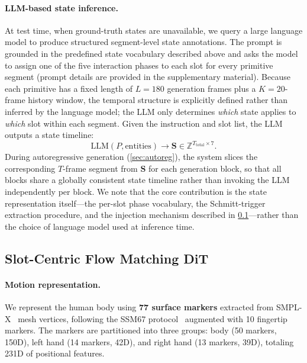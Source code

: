 \documentclass[sigconf, screen, review, anonymous]{acmart}
\begin{document}
\paragraph{LLM-based state inference.}
At test time, when ground-truth states are unavailable, we query a large language model to produce structured segment-level state annotations. The prompt is grounded in the predefined state vocabulary described above and asks the model to assign one of the five interaction phases to each slot for every primitive segment (prompt details are provided in the supplementary material). Because each primitive has a fixed length of $L{=}180$ generation frames plus a $K{=}20$-frame history window, the temporal structure is explicitly defined rather than inferred by the language model; the LLM only determines \emph{which} state applies to \emph{which} slot within each segment. Given the instruction and slot list, the LLM outputs a state timeline:
\begin{equation}
    \text{LLM}(P, \text{entities}) \rightarrow \mathbf{S} \in \mathbb{Z}^{T_{\text{total}} \times 7}.
    \label{eq:llm_planner}
\end{equation}
During autoregressive generation (\cref{sec:autoreg}), the system slices the corresponding $T$-frame segment from $\mathbf{S}$ for each generation block, so that all blocks share a globally consistent state timeline rather than invoking the LLM independently per block.
We note that the core contribution is the state representation itself---the per-slot phase vocabulary, the Schmitt-trigger extraction procedure, and the injection mechanism described in \cref{sec:slot_dit}---rather than the choice of language model used at inference time.



\subsection{Slot-Centric Flow Matching DiT}
\label{sec:slot_dit}

\paragraph{Motion representation.}
We represent the human body using \textbf{77 surface markers} extracted from SMPL-X~\cite{pavlakos2019expressive} mesh vertices, following the SSM67 protocol~\cite{xu2024interdiff} augmented with 10 fingertip markers. The markers are partitioned into three groups: body (50 markers, 150D), left hand (14 markers, 42D), and right hand (13 markers, 39D), totaling 231D of positional features.
\end{document}
